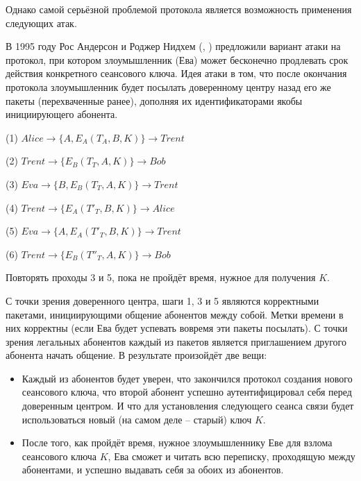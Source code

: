 Однако самой серьёзной проблемой протокола является возможность применения следующих атак.

В 1995 году Рос Андерсон и Роджер Нидхем (, \cite{Anderson:Needham:1995}) предложили вариант атаки на протокол, при котором злоумышленник (Ева) может бесконечно продлевать срок действия конкретного сеансового ключа. Идея атаки в том, что после окончания протокола злоумышленник будет посылать доверенному центру назад его же пакеты (перехваченные ранее), дополняя их идентификаторами якобы инициирующего абонента.

\begin{protocol}
	\item[(1)] $Alice \to \{ A, E_A \left( T_A, B, K \right) \} \to Trent$
	\item[(2)] $Trent \to \{ E_B \left( T_T, A, K \right) \} \to Bob$
	\item[(3)] $Eva \to \{ B, E_B \left( T_T, A, K \right) \} \to Trent$
	\item[(4)] $Trent \to \{ E_A \left( T'_T, B, K \right) \} \to Alice$
	\item[(5)] $Eva \to \{ A, E_A \left( T'_T, B, K \right) \} \to Trent$
	\item[(6)] $Trent \to \{ E_B \left( T''_T, A, K \right) \} \to Bob$
	\item[{}] Повторять проходы 3 и 5, пока не пройдёт время, нужное для получения $K$.
\end{protocol}

С точки зрения доверенного центра, шаги 1, 3 и 5 являются корректными пакетами, инициирующими общение абонентов между собой. Метки времени в них корректны (если Ева будет успевать вовремя эти пакеты посылать). С точки зрения легальных абонентов каждый из пакетов является приглашением другого абонента начать общение. В результате произойдёт две вещи:

\begin{itemize}
	\item Каждый из абонентов будет уверен, что закончился протокол создания нового сеансового ключа, что второй абонент успешно аутентифицировал себя перед доверенным центром. И что для установления следующего сеанса связи будет использоваться новый (на самом деле -- старый) ключ $K$.
	\item После того, как пройдёт время, нужное злоумышленнику Еве для взлома сеансового ключа $K$, Ева сможет и читать всю переписку, проходящую между абонентами, и успешно выдавать себя за обоих из абонентов.
\end{itemize}

